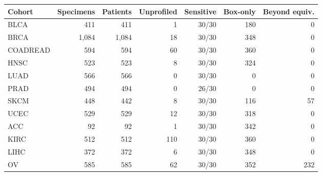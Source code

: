 \begin{tabular}{lrrrrrr}
\toprule
Cohort & Specimens & Patients & Unprofiled & Sensitive & Box-only & Beyond equiv.\\
\midrule
BLCA & 411 & 411 & 1 & 30/30 & 180 & 0\\
BRCA & 1,084 & 1,084 & 18 & 30/30 & 348 & 0\\
COADREAD & 594 & 594 & 60 & 30/30 & 360 & 0\\
HNSC & 523 & 523 & 8 & 30/30 & 324 & 0\\
LUAD & 566 & 566 & 0 & 30/30 & 0 & 0\\
PRAD & 494 & 494 & 0 & 26/30 & 0 & 0\\
SKCM & 448 & 442 & 8 & 30/30 & 116 & 57\\
UCEC & 529 & 529 & 12 & 30/30 & 318 & 0\\
ACC & 92 & 92 & 1 & 30/30 & 342 & 0\\
KIRC & 512 & 512 & 110 & 30/30 & 360 & 0\\
LIHC & 372 & 372 & 6 & 30/30 & 348 & 0\\
OV & 585 & 585 & 62 & 30/30 & 352 & 232\\
\bottomrule
\end{tabular}
